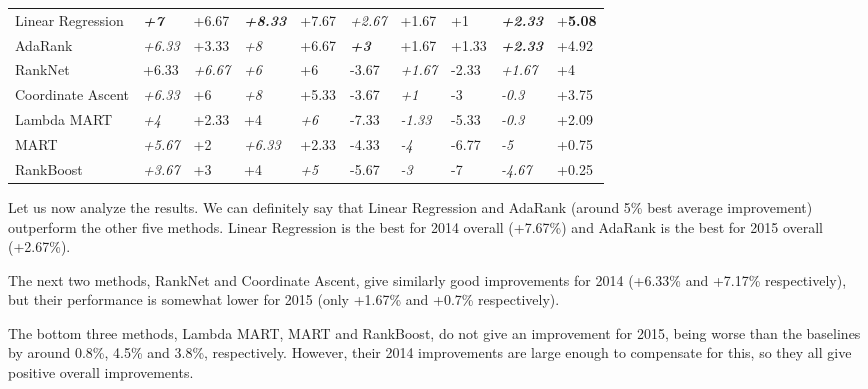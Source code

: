 \begin{table}
{\begin{tabular}{@{}llllllllll@{}}
Linear Regression & \textit{\textbf{+7}} & +6.67             & \textit{\textbf{+8.33}}   & +7.67              	& \textit{+2.67}       	& +1.67    		& +1          & \textit{\textbf{+2.33}}   & +\textbf{5.08}  \\
AdaRank           & \textit{+6.33}       & +3.33             & \textit{+8}               & +6.67              	& \textit{\textbf{+3}}	& +1.67         	& +1.33       & \textit{\textbf{+2.33}}   & +4.92  \\
RankNet           & +6.33             	 & \textit{+6.67}    & \textit{+6}               & +6                 	& -3.67       		& \textit{+1.67}        & -2.33       & \textit{+1.67}            & +4  \\
Coordinate Ascent & \textit{+6.33}       & +6                & \textit{+8}               & +5.33              	& -3.67      		& \textit{+1}           & -3          & \textit{-0.3}             & +3.75  \\
Lambda MART	  & \textit{+4}		 & +2.33	     & +4		         & \textit{+6}	   	& -7.33			& \textit{-1.33}	& -5.33	      & \textit{-0.3}		  & +2.09  \\
MART	 	  & \textit{+5.67}	 & +2		     & \textit{+6.33}	         & +2.33		& -4.33			& \textit{-4}		& -6.77	      & \textit{-5}		  & +0.75 \\
RankBoost	  & \textit{+3.67}	 & +3		     & +4		         & \textit{+5}		& -5.67			& \textit{-3}		& -7	      & \textit{-4.67}		  & +0.25 \\

\bottomrule
\end{tabular}%
}
\end{table}

Let us now analyze the results. We can definitely say that Linear Regression and AdaRank (around 5\% best average improvement)
outperform the other five methods. Linear Regression is the best for 2014 overall (+7.67\%) and
AdaRank is the best for 2015 overall (+2.67\%).

The next two methods, RankNet and Coordinate Ascent, give similarly good
improvements for 2014 (+6.33\% and +7.17\% respectively), but their performance is somewhat lower
for 2015 (only +1.67\% and +0.7\% respectively).

The bottom three methods, Lambda MART, MART and RankBoost, do not give an improvement for 2015, being worse
than the baselines by around 0.8\%, 4.5\% and 3.8\%, respectively. However, their 2014 improvements are large enough to compensate
for this, so they all give positive overall improvements.

